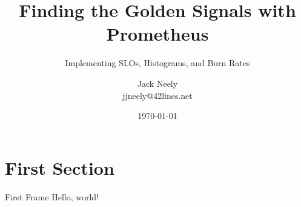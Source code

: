 

\title{Finding the Golden Signals with Prometheus}
\subtitle{Implementing SLOs, Histograms, and Burn Rates}
\author{Jack Neely\\ jjneely@42lines.net}

\date{\today}



  \maketitle
  \section{First Section}
  \begin{frame}{First Frame}
    Hello, world!
  \end{frame}


